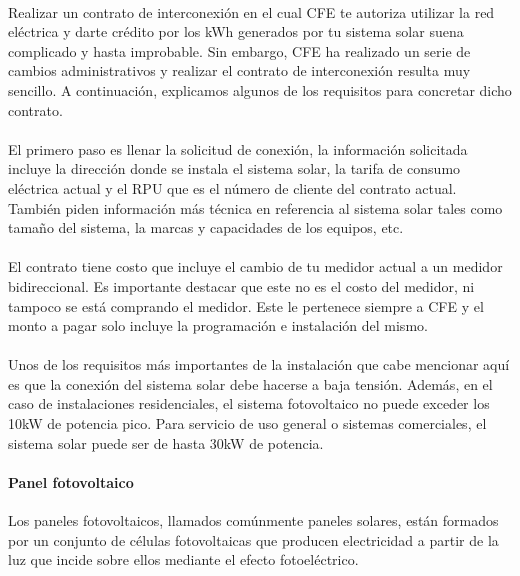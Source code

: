 \paragraph{}
Realizar un contrato de interconexión en el cual CFE te autoriza utilizar la red eléctrica y darte crédito por los kWh generados por tu sistema solar suena complicado y hasta improbable. Sin embargo, CFE ha realizado un serie de cambios administrativos y realizar el contrato de interconexión resulta muy sencillo. A continuación, explicamos algunos de los requisitos para concretar dicho contrato.
\paragraph{}
El primero paso es llenar la solicitud de conexión, la información solicitada incluye la dirección donde se instala el sistema solar, la tarifa de consumo eléctrica actual y el RPU que es el número de cliente del contrato actual. También piden información más técnica en referencia al sistema solar tales como tamaño del sistema, la marcas y capacidades de los equipos, etc.
\paragraph{}
El contrato tiene costo que incluye el cambio de tu medidor actual a un medidor bidireccional. Es importante destacar que este no es el costo del medidor, ni tampoco se está comprando el medidor. Este le pertenece siempre a CFE y el monto a pagar solo incluye la programación e instalación del mismo.
\paragraph{}
Unos de los requisitos más importantes de la instalación que cabe mencionar aquí es que la conexión del sistema solar debe hacerse a baja tensión. Además, en el caso de instalaciones residenciales, el sistema fotovoltaico no puede exceder los 10kW de potencia pico. Para servicio de uso general o sistemas comerciales, el sistema solar puede ser de hasta 30kW de potencia.
\paragraph{}

\paragraph{Panel fotovoltaico}
Los paneles fotovoltaicos, llamados comúnmente paneles solares, están formados por un conjunto de células fotovoltaicas que producen electricidad a partir de la luz que incide sobre ellos mediante el efecto fotoeléctrico.
